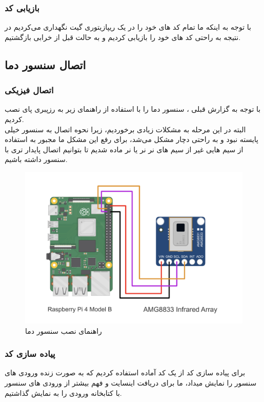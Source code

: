 \documentclass[12pt]{article}
\begin{document}
\subsubsection{بازیابی کد}
با توجه به اینکه ما تمام کد های خود را در یک ریپازیتوری گیت نگهداری می‌کردیم در نتیجه به راحتی کد های خود را بازیابی کردیم و به حالت قبل از خرابی بازگشتیم.


\newpage

\subsection{اتصال سنسور دما}

\subsubsection{اتصال فیزیکی}

با توجه به گزارش قبلی ، سنسور دما را با استفاده از راهنمای زیر به رزپبری پای نصب کردیم.
\\
البته در این مرحله به مشکلات زیادی برخوردیم، زیرا نحوه اتصال به سنسور خیلی پایسته نبود و به راحتی دچار مشکل می‌شد، برای رفع این مشکل ما مجبور به استفاده از سیم هایی غیر از سیم های نر نر یا نر ماده شدیم تا بتوانیم اتصال پایدار تری با سنسور داشته باشیم.

\begin{figure}[h]
	\begin{center}
		\includegraphics[width=.75\textwidth]{images/amg8833_RPi4_wiring.png}
	\end{center}
	\caption{راهنمای نصب سنسور دما}
\end{figure}

\subsubsection{پیاده سازی کد}

برای پیاده سازی کد از یک کد آماده استفاده کردیم که به صورت زنده ورودی های سنسور را نمایش میداد، ما برای دریافت اینسایت و فهم بیشتر از ورودی های سنسور با کتابخانه  ورودی را به نمایش گذاشتیم.
 
\end{document}
